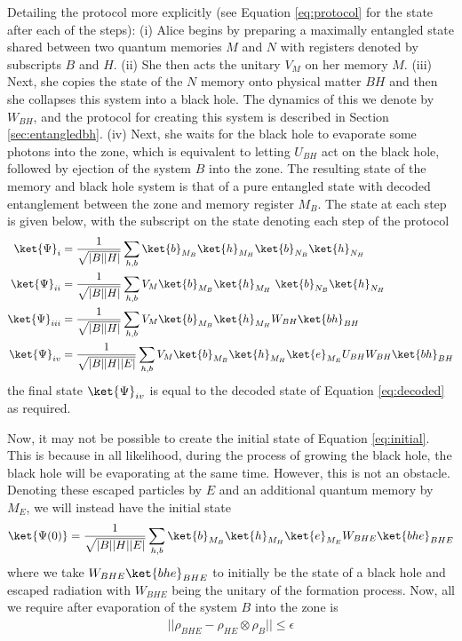 \documentclass[12pt,a4paper]{article}
\begin{document}
Detailing the protocol more explicitly (see Equation \ref{eq:protocol} for the state after each of the steps): (i)
Alice begins by preparing a maximally entangled state shared between two quantum memories $M$ and $N$ with registers denoted by subscripts $B$ and $H$.
(ii) She then acts the unitary $V_{M}$  on her memory $M$. (iii) Next, she copies the state of the $N$ memory onto physical matter $BH$ and then she collapses this system into a black hole. The dynamics of this we denote by $W_{BH}$, and the protocol for creating this system is described in Section \ref{sec:entangledbh}. (iv) Next, she waits for the black hole to evaporate some photons into the zone, which is equivalent to letting $U_{BH}$ act on the black hole, followed by ejection of the system $B$ into the zone. The resulting state of the memory and black hole system is that of a pure entangled state with decoded entanglement between the zone and memory register $M_B$. The state at each step is given below, with the subscript on the state denoting each step of the protocol
\begin{align}
\ket{\Psi}_i&=\frac{1}{\sqrt{|B||H|}}
\sum_{h,b}\ket{b}_{M_B}\ket{h}_{M_H}\ket{b}_{N_B}\ket{h}_{N_H}\nonumber\\
\ket{\Psi}_{ii}&=\frac{1}{\sqrt{|B||H|}}
\sum_{h,b} V_M\ket{b}_{M_B}\ket{h}_{M_H}\ \ket{b}_{N_B}\ket{h}_{N_H}\nonumber\\
\ket{\Psi}_{iii}&=\frac{1}{\sqrt{|B||H|}}
\sum_{h,b} V_M\ket{b}_{M_B}\ket{h}_{M_H}W_{BH} \ket{bh}_{BH}\nonumber\\
\ket{\Psi}_{iv}&=\frac{1}{\sqrt{|B||H||E|}}
\sum_{h,b} V_M\ket{b}_{M_B}\ket{h}_{M_H}\ket{e}_{M_E}U_{BH}W_{BH} \ket{bh}_{BH} \nonumber\\
\label{eq:protocol}
\end{align} 
the final state $\ket{\Psi}_{iv}$ is equal to the decoded state of Equation \eqref{eq:decoded} as required.
 

Now, it may not be possible to create the initial state of Equation \eqref{eq:initial}. This is because in all likelihood, during the process of growing the black hole, the black hole will be evaporating at the same time. However, this is not an obstacle. Denoting these escaped particles by $E$ and an additional quantum memory by $M_E$,
we will instead have the initial state
\begin{align}
\ket{\Psi(0)}=\frac{1}{\sqrt{|B||H||E|}}
\sum_{h,b}\ket{b}_{M_B}\ket{h}_{M_H}\ket{e}_{M_E} W_{BHE} \ket{bhe}_{BHE}
\label{eq:initialE}
\end{align}
where we take $W_{BHE}\ket{bhe}_{BHE}$ to initially be the state of a black hole and escaped radiation with $W_{BHE}$ being the unitary of the formation
process.  Now, all we require after evaporation of the system $B$ into the zone is
\begin{align}
||\rho_{BHE}-\rho_{HE}\otimes\rho_{B}||\leq \epsilon
\label{eq:productBE}
\end{align}
\end{document}
